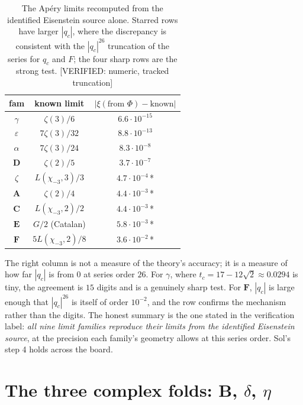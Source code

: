 \documentclass[11pt,reqno]{amsart}
\theoremstyle{plain}
\theoremstyle{definition}
\theoremstyle{remark}
\newcommand{\chim}[1]{\chi_{-#1}}
\newcommand{\VerifiedR}[1]{\textup{\textsf{[VERIFIED: #1]}}}
\begin{document}
\begin{table}[t]
\caption{The Ap\'ery limits recomputed from the identified Eisenstein
source alone. Starred rows have larger $|q_c|$, where the discrepancy is
consistent with the $|q_c|^{26}$ truncation of the series for $q_c$ and
$F$; the four sharp rows are the strong test.
\VerifiedR{numeric, tracked truncation}}
\label{tab:limits}
\begin{tabular}{@{}c c c@{}}
\toprule
fam & known limit & $|\xi(\text{from }\Phi)-\text{known}|$\\
\midrule
$\gamma$ & $\zeta(3)/6$ & $6.6\cdot10^{-15}$\\
$\varepsilon$ & $7\zeta(3)/32$ & $8.8\cdot10^{-13}$\\
$\alpha$ & $7\zeta(3)/24$ & $8.3\cdot10^{-8}$\\
$\mathbf D$ & $\zeta(2)/5$ & $3.7\cdot10^{-7}$\\
$\zeta$ & $L(\chim3,3)/3$ & $4.7\cdot10^{-4}$\,*\\
$\mathbf A$ & $\zeta(2)/4$ & $4.4\cdot10^{-3}$\,*\\
$\mathbf C$ & $L(\chim3,2)/2$ & $4.4\cdot10^{-3}$\,*\\
$\mathbf E$ & $G/2$ (Catalan) & $5.8\cdot10^{-3}$\,*\\
$\mathbf F$ & $5L(\chim3,2)/8$ & $3.6\cdot10^{-2}$\,*\\
\bottomrule
\end{tabular}
\end{table}

The right column is not a measure of the theory's accuracy; it is a measure
of how far $|q_c|$ is from $0$ at series order $26$. For $\gamma$, where
$t_c=17-12\sqrt2\approx0.0294$ is tiny, the agreement is $15$
digits and is a genuinely sharp test. For $\mathbf F$, $|q_c|$ is large
enough that $|q_c|^{26}$ is itself of order $10^{-2}$, and the row confirms
the mechanism rather than the digits. The honest summary is the one stated
in the verification label: \emph{all nine limit families reproduce their
limits from the identified Eisenstein source}, at the precision each
family's geometry allows at this series order. Sol's step 4 holds across the
board.

\section{The three complex folds: $\mathbf B$, $\delta$, $\eta$}
\label{sec:complex}
\end{document}
